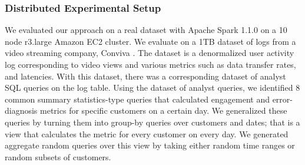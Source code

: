 \subsubsection{Distributed Experimental Setup}
We evaluated our approach on a real dataset with Apache Spark 1.1.0 on a 10 node r3.large Amazon EC2 cluster.
We evaluate \svc on a 1TB dataset of logs from a video streaming company, Conviva \cite{conviva}.
The dataset is a denormalized user activity log corresponding to video views and various metrics such as data transfer rates, and latencies.
With this dataset, there was a corresponding dataset of analyst SQL queries on the log table.
Using the dataset of analyst queries, we identified 8 common summary statistics-type queries that calculated engagement and error-diagnosis metrics for specific customers on a certain day.
We generalized these queries by turning them into group-by queries over customers and dates; that is a view that calculates the metric for every customer on every day.
We generated aggregate random queries over this view by taking either random time ranges or random subsets of customers.
\iffalse
